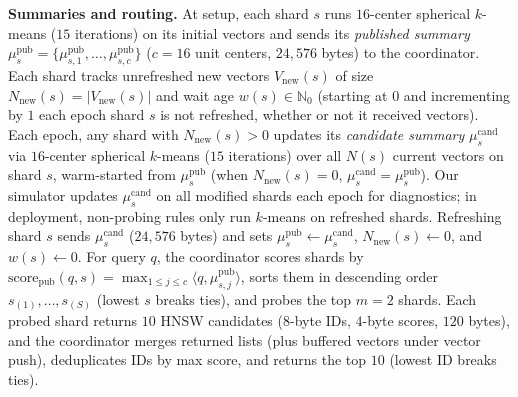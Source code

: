 \textbf{Summaries and routing.} At setup, each shard $s$ runs $16$-center spherical $k$-means ($15$ iterations) on its initial vectors and sends its \emph{published summary} $\mu_s^{\text{pub}} = \{\mu_{s,1}^{\text{pub}}, \dots, \mu_{s,c}^{\text{pub}}\}$ ($c = 16$ unit centers, $24{,}576$ bytes) to the coordinator. Each shard tracks unrefreshed new vectors $V_{\text{new}}(s)$ of size $N_{\text{new}}(s) = |V_{\text{new}}(s)|$ and wait age $w(s) \in \mathbb{N}_0$ (starting at $0$ and incrementing by $1$ each epoch shard $s$ is not refreshed, whether or not it received vectors). Each epoch, any shard with $N_{\text{new}}(s) > 0$ updates its \emph{candidate summary} $\mu_s^{\text{cand}}$ via $16$-center spherical $k$-means ($15$ iterations) over all $N(s)$ current vectors on shard $s$, warm-started from $\mu_s^{\text{pub}}$ (when $N_{\text{new}}(s) = 0$, $\mu_s^{\text{cand}} = \mu_s^{\text{pub}}$). Our simulator updates $\mu_s^{\text{cand}}$ on all modified shards each epoch for diagnostics; in deployment, non-probing rules only run $k$-means on refreshed shards. Refreshing shard $s$ sends $\mu_s^{\text{cand}}$ ($24{,}576$ bytes) and sets $\mu_s^{\text{pub}} \leftarrow \mu_s^{\text{cand}}$, $N_{\text{new}}(s) \leftarrow 0$, and $w(s) \leftarrow 0$. For query $q$, the coordinator scores shards by $\text{score}_{\text{pub}}(q, s) = \max_{1 \le j \le c} \langle q, \mu_{s,j}^{\text{pub}} \rangle$, sorts them in descending order $s_{(1)}, \dots, s_{(S)}$ (lowest $s$ breaks ties), and probes the top $m = 2$ shards. Each probed shard returns $10$ HNSW candidates ($8$-byte IDs, $4$-byte scores, $120$ bytes), and the coordinator merges returned lists (plus buffered vectors under vector push), deduplicates IDs by max score, and returns the top $10$ (lowest ID breaks ties).

